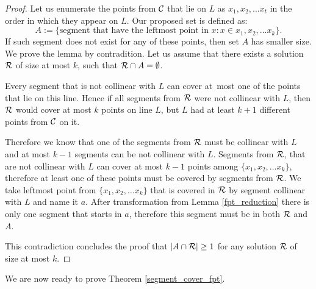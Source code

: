 \begin{proof}

Let us enumerate the points from $\mathcal{C}$ that lie on $L$ as $x_1, x_2, \ldots x_t$
in the order in which they appear on $L$.
Our proposed set is defined as:
$$A := \{ \text{segment that have the leftmost point in } x : x \in x_1, x_2, \ldots x_k\}.$$
If such segment does not exist for any of these points,
then set $A$ has smaller size.
We prove the lemma by contradition. Let us assume that there
exists a solution $\mathcal{R}$ of size at most $k$, such that $\mathcal{R} \cap A = \emptyset$.

Every segment that is not collinear with $L$ can cover at~most one of
the points that lie on this line.
Hence if all segments from $\mathcal{R}$ were not collinear with $L$, then
$\mathcal{R}$ would cover at most $k$ points on line $L$,
but $L$ had at least $k+1$ different points from $\mathcal{C}$ on it.

Therefore we know that one of the segments from $\mathcal{R}$ must be collinear with $L$
and at most $k-1$ segments can be not collinear with $L$.
Segments from $\mathcal{R}$, that are not collinear with $L$ can cover at most $k-1$
points among $\{x_1, x_2, \ldots x_k\}$, therefore at least
one of these points must be covered by segments from $\mathcal{R}$.
We take leftmost point from $\{x_1, x_2, \ldots x_k\}$ that is
covered in $\mathcal{R}$ by segment collinear with $L$ and name it $a$.
After transformation from Lemma \ref{fpt_reduction}
there is only one segment that starts in $a$, therefore
this segment must be in both $\mathcal{R}$ and $A$.

This contradiction concludes the proof that $|A \cap \mathcal{R}| \ge 1$
for any solution $\mathcal{R}$ of size at most $k$.
\end{proof}

We are now ready to prove Theorem \ref{segment_cover_fpt}.

